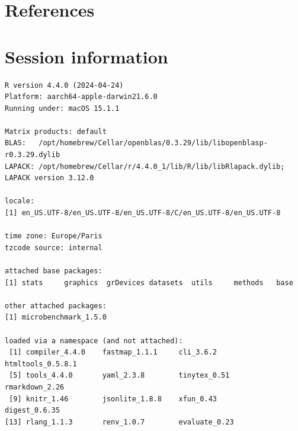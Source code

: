 \documentclass[
  11pt,
  a4paper,
]{article}
\theoremstyle{plain}
\theoremstyle{plain}
\theoremstyle{plain}
\theoremstyle{definition}
\theoremstyle{definition}
\theoremstyle{remark}
\begin{document}
\section*{References}\label{references}

\renewcommand{\bibsection}{}


\section*{Session information}\label{session-information}

\begin{verbatim}
R version 4.4.0 (2024-04-24)
Platform: aarch64-apple-darwin21.6.0
Running under: macOS 15.1.1

Matrix products: default
BLAS:   /opt/homebrew/Cellar/openblas/0.3.29/lib/libopenblasp-r0.3.29.dylib 
LAPACK: /opt/homebrew/Cellar/r/4.4.0_1/lib/R/lib/libRlapack.dylib;  LAPACK version 3.12.0

locale:
[1] en_US.UTF-8/en_US.UTF-8/en_US.UTF-8/C/en_US.UTF-8/en_US.UTF-8

time zone: Europe/Paris
tzcode source: internal

attached base packages:
[1] stats     graphics  grDevices datasets  utils     methods   base     

other attached packages:
[1] microbenchmark_1.5.0

loaded via a namespace (and not attached):
 [1] compiler_4.4.0    fastmap_1.1.1     cli_3.6.2         htmltools_0.5.8.1
 [5] tools_4.4.0       yaml_2.3.8        tinytex_0.51      rmarkdown_2.26   
 [9] knitr_1.46        jsonlite_1.8.8    xfun_0.43         digest_0.6.35    
[13] rlang_1.1.3       renv_1.0.7        evaluate_0.23    
\end{verbatim}
\end{document}
